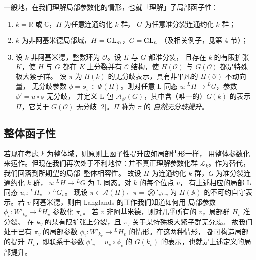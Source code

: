 一般地，在我们理解局部参数化的情形，也就「理解」了局部函子性：
\begin{enumerate}[label=\arabic*.,leftmargin=*]
  \item $k=\mathbb{R}$ 或 $\mathbb{C}$，$H$ 为任意连通约化 $k$ 群，
    $G$ 为任意准分裂连通约化 $k$ 群；
  \item $k$ 为非阿基米德局部域，$H=\mathrm{GL}_m$，$G=\mathrm{GL}_n$
    （及相关例子，见第 4 节）；
  \item 设 $k$ 非阿基米德，整数环为 $\mathcal{O}$。设 $H$ 与 $G$ 都准分裂，
    且存在 $k$ 的有限扩张 $K$，使 $H$ 与 $G$ 都在 $K$ 上分裂并有 $\mathcal{O}$
    结构，使 $H(\mathcal{O})$ 与 $G(\mathcal{O})$ 都是特殊极大紧子群。
    设 $\pi$ 为 $H(k)$ 的无分歧表示，具有非平凡的 $H(\mathcal{O})$ 不动向量，
    无分歧参数 $\phi=\phi_\pi\in\Phi(H)$。则对任意 L 同态
    $u\colon{}^{L}H\to{}^{L}G$，参数 $\phi'=u\circ\phi$ 无分歧，
    并定义 L 包 $\mathcal{A}_{\phi'}(G)$，其中含（唯一的）$G(k)$ 的表示
    $\Pi$，它关于 $G(\mathcal{O})$ 无分歧 [2]。$\Pi$ 称为 $\pi$ 的
    \emph{自然无分歧提升}。
\end{enumerate}

\subsection{整体函子性}

若现在考虑 $k$ 为整体域，则原则上函子性提升应如局部情形一样，
用整体参数化来运作。但现在我们再次处于不利地位：并不真正理解参数化群
$\mathcal{L}_k$。作为替代，我们回落到所期望的局部--整体相容性。
故设 $H$ 为连通约化 $k$ 群，$G$ 为准分裂连通约化 $k$ 群，
$u\colon{}^{L}H\to{}^{L}G$ 为 L 同态。对 $k$ 的每个位点 $v$，
有上述相应的局部 L 同态 $u_v\colon{}^{L}H_v\to{}^{L}G_v$。
现设 $\pi\in\mathcal{A}(H)$、$\pi=\bigotimes'_v\pi_v$ 为 $H(\mathbb{A})$
的不可约自守表示。若 $v$ 阿基米德，则由 Langlands 的工作我们知道如何用
局部参数 $\phi_v\colon W'_{k_v}\to{}^{L}H_v$ 参数化 $\pi_v$。
若 $v$ 非阿基米德，则对几乎所有的 $v$，局部群 $H_v$ 准分裂、
在 $k_v$ 的某有限扩张上分裂，且 $\pi_v$ 关于某特殊极大紧子群无分歧。
故我们处于已有 $\pi_v$ 的局部参数
$\phi_v\colon W'_{k_v}\to{}^{L}H_v$ 的情形。在这两种情形，
都可构造局部的提升 $\Pi_v$，即联系于参数 $\phi'_v=u_v\circ\phi_v$ 的
$G(k_v)$ 的表示，也就是上述定义的局部提升。

